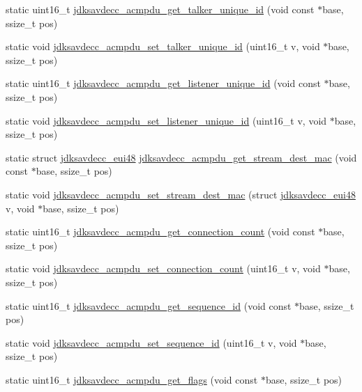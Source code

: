 \begin{DoxyCompactItemize}
\item 
static uint16\+\_\+t \hyperlink{group__acmpdu_ga1f24a73adfcd4cf526ad8c10a6f2e42f}{jdksavdecc\+\_\+acmpdu\+\_\+get\+\_\+talker\+\_\+unique\+\_\+id} (void const $\ast$base, ssize\+\_\+t pos)
\item 
static void \hyperlink{group__acmpdu_ga10f125e26af15cfa93b6d78f816bc5b7}{jdksavdecc\+\_\+acmpdu\+\_\+set\+\_\+talker\+\_\+unique\+\_\+id} (uint16\+\_\+t v, void $\ast$base, ssize\+\_\+t pos)
\item 
static uint16\+\_\+t \hyperlink{group__acmpdu_ga36867bfc130619cbea38caa3ce54bc89}{jdksavdecc\+\_\+acmpdu\+\_\+get\+\_\+listener\+\_\+unique\+\_\+id} (void const $\ast$base, ssize\+\_\+t pos)
\item 
static void \hyperlink{group__acmpdu_ga145ab4b4c8d4b9a8aec41a8a6612342e}{jdksavdecc\+\_\+acmpdu\+\_\+set\+\_\+listener\+\_\+unique\+\_\+id} (uint16\+\_\+t v, void $\ast$base, ssize\+\_\+t pos)
\item 
static struct \hyperlink{structjdksavdecc__eui48}{jdksavdecc\+\_\+eui48} \hyperlink{group__acmpdu_gab4aa881e376764517889c5436d57e4d5}{jdksavdecc\+\_\+acmpdu\+\_\+get\+\_\+stream\+\_\+dest\+\_\+mac} (void const $\ast$base, ssize\+\_\+t pos)
\item 
static void \hyperlink{group__acmpdu_ga04659beda1da62ccecab89d22185354e}{jdksavdecc\+\_\+acmpdu\+\_\+set\+\_\+stream\+\_\+dest\+\_\+mac} (struct \hyperlink{structjdksavdecc__eui48}{jdksavdecc\+\_\+eui48} v, void $\ast$base, ssize\+\_\+t pos)
\item 
static uint16\+\_\+t \hyperlink{group__acmpdu_ga28f4116aa95376ec5378febf22e830b5}{jdksavdecc\+\_\+acmpdu\+\_\+get\+\_\+connection\+\_\+count} (void const $\ast$base, ssize\+\_\+t pos)
\item 
static void \hyperlink{group__acmpdu_ga79c9e27370ff9cbacb95460beecbc500}{jdksavdecc\+\_\+acmpdu\+\_\+set\+\_\+connection\+\_\+count} (uint16\+\_\+t v, void $\ast$base, ssize\+\_\+t pos)
\item 
static uint16\+\_\+t \hyperlink{group__acmpdu_gaf20d00ac6431b19d3f1213b4b6bf6fd5}{jdksavdecc\+\_\+acmpdu\+\_\+get\+\_\+sequence\+\_\+id} (void const $\ast$base, ssize\+\_\+t pos)
\item 
static void \hyperlink{group__acmpdu_gac25bc4c2517c617eab5713ab6e1e162d}{jdksavdecc\+\_\+acmpdu\+\_\+set\+\_\+sequence\+\_\+id} (uint16\+\_\+t v, void $\ast$base, ssize\+\_\+t pos)
\item 
static uint16\+\_\+t \hyperlink{group__acmpdu_ga06f11c5b5fb71fe01ca397e95848fcb6}{jdksavdecc\+\_\+acmpdu\+\_\+get\+\_\+flags} (void const $\ast$base, ssize\+\_\+t pos)

\end{DoxyCompactItemize}
